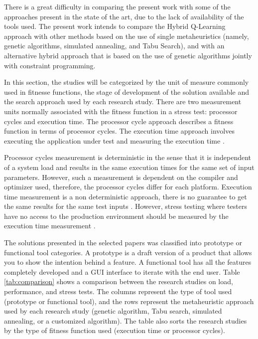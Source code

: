 \documentclass{bmcart}
\begin{document}
There is a great difficulty in comparing the present work with some of the approaches present in the state of the art, due to the lack of availability of the tools used.  The present work intends to compare the Hybrid Q-Learning approach with other methods based on the use of single metaheuristics (namely, genetic algorithms, simulated annealing, and Tabu Search), and with an alternative hybrid approach that is based on the use of genetic algorithms jointly with constraint programming.

In this section, the studies will be categorized by the unit of measure commonly used in fitnesse functions, the stage of development of the solution available and the search approach used  by each research study. There are two measurement units normally associated with the fitness function in a stress test: processor cycles and execution time. The processor cycle approach describes a fitness function in terms of processor cycles. The execution time approach involves executing the application under test and measuring the execution time \citep{Afzal2009a} \citep{tracey2000search}.

Processor cycles measurement is deterministic in the sense that it is independent of a system load and results in the same execution times for the same set of input parameters. However, such a measurement is dependent on the compiler and optimizer used, therefore, the processor cycles differ for each platform. Execution time measurement is a non deterministic approach, there is no guarantee to get the same results for the same test inputs \citep{Afzal2009a}.  However, stress testing where testers have no access to the production environment should be measured by the execution time measurement \citep{Molyneaux2009} \citep{Afzal2009a}.

The solutions presented in the selected papers was classified into prototype or functional tool categories. A prototype is a draft version of a product that allows you to show the intention behind a feature. A functional tool has all the features completely developed and a GUI interface to iterate with the end user. Table \ref{tab:comparison}  shows a comparison between the research studies on load, performance, and stress tests. The columns represent the type of tool used (prototype or functional tool), and the rows represent the metaheuristic approach used by each research study (genetic algorithm, Tabu search, simulated annealing, or a customized algorithm). The table also sorts the research studies by the type of fitness function used (execution time or processor cycles). 
\end{document}
